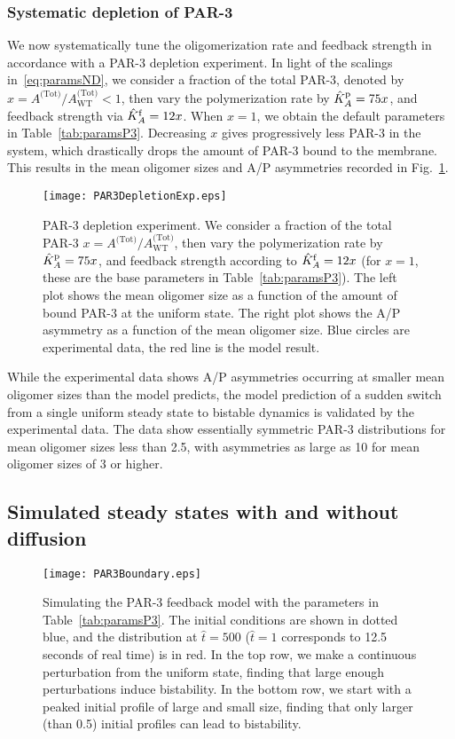 \documentclass[11pt]{article}
\newcommand{\6}[1]{#1_{\text{6}}}
\newcommand{\3}[1]{#1_{\text{3}}}
\newcommand{\Tot}[1]{#1^\text{(Tot)}}
\begin{document}
\subsubsection{Systematic depletion of PAR-3}
We now systematically tune the oligomerization rate and feedback strength in accordance with a PAR-3 depletion experiment. In light of the scalings in\ \eqref{eq:paramsND}, we consider a fraction of the total PAR-3, denoted by $x=\Tot{A}/\Tot{A}_\text{WT} < 1$, then vary the polymerization rate by $\hat{K}^\text{p}_A=75x$, and feedback strength via $\hat{K}^\text{f}_A=12x$. When $x=1$, we obtain the default parameters in Table\ \ref{tab:paramsP3}. Decreasing $x$ gives progressively less PAR-3 in the system, which drastically drops the amount of PAR-3 bound to the membrane. This results in the mean oligomer sizes and A/P asymmetries recorded in Fig.\ \ref{fig:P3Depl}. 

\begin{figure}
\centering
\texttt{[image: PAR3DepletionExp.eps]}
\caption{\label{fig:P3Depl}PAR-3 depletion experiment. We consider a fraction of the total PAR-3 $x=\Tot{A}/\Tot{A}_\text{WT}$, then vary the polymerization rate by $\hat{K}^\text{p}_A=75x$, and feedback strength according to $\hat{K}^\text{f}_A=12x$ (for $x=1$, these are the base parameters in Table\ \ref{tab:paramsP3}). The left plot shows the mean oligomer size as a function of the amount of bound PAR-3 at the uniform state. The right plot shows the A/P asymmetry as a function of the mean oligomer size. Blue circles are experimental data, the red line is the model result.}
\end{figure}

While the experimental data shows A/P asymmetries occurring at smaller mean oligomer sizes than the model predicts, the model prediction of a sudden switch from a single uniform steady state to bistable dynamics is validated by the experimental data. The data show essentially symmetric PAR-3 distributions for mean oligomer sizes less than 2.5, with asymmetries as large as 10 for mean oligomer sizes of 3 or higher. 

\subsection{Simulated steady states with and without diffusion}
\begin{figure}
\centering
\texttt{[image: PAR3Boundary.eps]}
\caption{\label{fig:P3FBBd}Simulating the PAR-3 feedback model with the parameters in Table\ \ref{tab:paramsP3}. The initial conditions are shown in dotted blue, and the distribution at $\hat t = 500$ ($\hat t =1$ corresponds to 12.5 seconds of real time) is in red. In the top row, we make a continuous perturbation from the uniform state, finding that large enough perturbations induce bistability. In the bottom row, we start with a peaked initial profile of large and small size, finding that only larger (than 0.5) initial profiles can lead to bistability.}
\end{figure}
\end{document}
